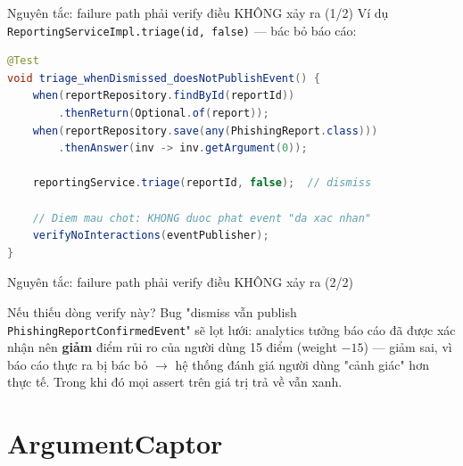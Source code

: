 \documentclass[aspectratio=169,12pt]{beamer}
\begin{document}
\begin{frame}[fragile]{Nguyên tắc: failure path phải verify điều KHÔNG xảy ra (1/2)}
  Ví dụ \texttt{ReportingServiceImpl\allowbreak.triage(id, false)} --- bác bỏ báo cáo:
\begin{lstlisting}[language=java,basicstyle=\ttfamily\scriptsize]
@Test
void triage_whenDismissed_doesNotPublishEvent() {
    when(reportRepository.findById(reportId))
        .thenReturn(Optional.of(report));
    when(reportRepository.save(any(PhishingReport.class)))
        .thenAnswer(inv -> inv.getArgument(0));

    reportingService.triage(reportId, false);  // dismiss

    // Diem mau chot: KHONG duoc phat event "da xac nhan"
    verifyNoInteractions(eventPublisher);
}
\end{lstlisting}
\end{frame}

\begin{frame}{Nguyên tắc: failure path phải verify điều KHÔNG xảy ra (2/2)}
  \begin{alertblock}{Nếu thiếu dòng verify này?}
    Bug "dismiss vẫn publish \texttt{PhishingReportConfirmedEvent}" sẽ lọt lưới:
    analytics tưởng báo cáo đã được xác nhận nên \textbf{giảm} điểm rủi ro
    của người dùng 15 điểm (weight $-15$) --- giảm sai, vì báo cáo thực ra
    bị bác bỏ $\to$ hệ thống đánh giá người dùng "cảnh giác" hơn thực tế.
    Trong khi đó mọi assert trên giá trị trả về vẫn xanh.
  \end{alertblock}
\end{frame}

\section{ArgumentCaptor}
\end{document}
